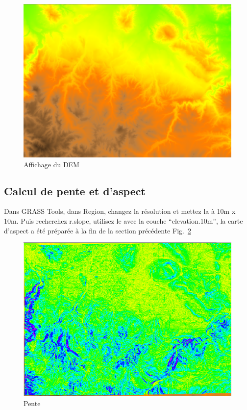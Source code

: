 \begin{figure}[htbp]
   \centering
   \includegraphics[scale=0.35]{grass009.png}
   \caption{Affichage du DEM}
   \label{fig:grass009}
\end{figure}

\subsection{Calcul de pente et d'aspect}
Dans GRASS Tools, dans Region, changez la r\'esolution et mettez la \`a 10m x 10m. Puis recherchez r.slope, utilisez le avec la couche ``elevation.10m'', la carte d'aspect a \'et\'e pr\'epar\'ee \`a la fin de la section pr\'ec\'edente Fig.~\ref{fig:grass010}

\begin{figure}[htbp]
   \centering
   \includegraphics[scale=0.35]{grass010.png}
   \caption{Pente}
   \label{fig:grass010}
\end{figure}

